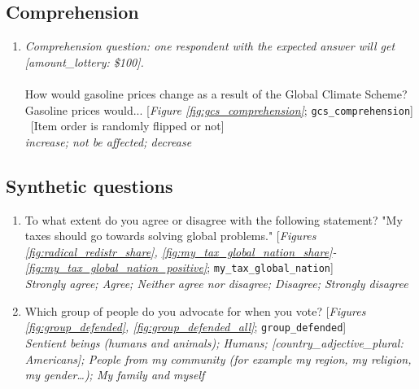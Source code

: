  \subsection*{Comprehension} 
 \begin{enumerate}[resume] 
\item  \label{q:gcs_comprehension} \textit{Comprehension question: one respondent with the expected answer will get [amount\_lottery: \$100].}\\\\How would gasoline prices change as a result of the Global Climate Scheme? \\Gasoline prices would... [\textit{Figure \ref{fig:gcs_comprehension}}; 
\verb|gcs_comprehension|]
~[Item order is randomly flipped or not]
  \\ \textit{increase; not be affected; decrease}

\end{enumerate} 

 \subsection*{Synthetic questions} 
 \begin{enumerate}[resume] 
\item  \label{q:my_tax_global_nation} To what extent do you agree or disagree with the following statement? "My taxes should go towards solving global problems." [\textit{Figures \ref{fig:radical_redistr_share}, \ref{fig:my_tax_global_nation_share}-\ref{fig:my_tax_global_nation_positive}}; 
\verb|my_tax_global_nation|]
  \\ \textit{Strongly agree; Agree; Neither agree nor disagree; Disagree; Strongly disagree}

\item  \label{q:group_defended} Which group of people do you advocate for when you vote? [\textit{Figures \ref{fig:group_defended}, \ref{fig:group_defended_all}}; 
\verb|group_defended|] %
  \\ \textit{Sentient beings (humans and animals); Humans; [country\_adjective\_plural: Americans]; People from my community (for example my region, my religion, my gender…); My family and myself}

\end{enumerate} 


